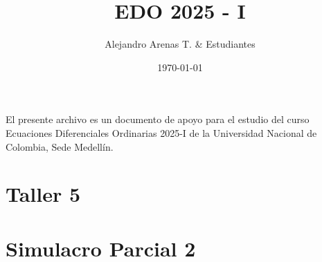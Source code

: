 \documentclass[11pt,a4paper]{article}
\title{EDO 2025 - I }
\author{Alejandro Arenas T. \& Estudiantes}
\date{\today}
\begin{document}
\maketitle

El presente archivo es un documento de apoyo para el estudio del curso Ecuaciones Diferenciales Ordinarias 2025-I de la Universidad Nacional de Colombia, Sede Medellín.


\tableofcontents

\newpage

\section{Taller 5}



\newpage
\section{Simulacro Parcial 2}

\end{document}
